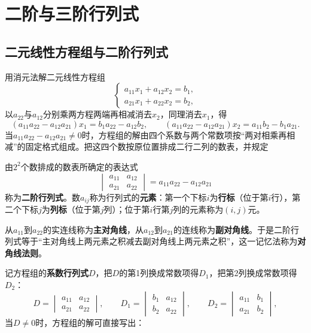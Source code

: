 \section{二阶与三阶行列式}

\subsection{二元线性方程组与二阶行列式}

用消元法解二元线性方程组
\[
\begin{cases}
a_{11}x_1+a_{12}x_2=b_1,\\
a_{21}x_1+a_{22}x_2=b_2,
\end{cases}
\]
以$a_{22}$与$a_{12}$分别乘两方程两端再相减消去$x_2$，同理消去$x_1$，得
\[
(a_{11}a_{22}-a_{12}a_{21})x_1=b_1a_{22}-a_{12}b_2,\qquad
(a_{11}a_{22}-a_{12}a_{21})x_2=a_{11}b_2-b_1a_{21}.
\]
当$a_{11}a_{22}-a_{12}a_{21}\neq 0$时，方程组的解由四个系数与两个常数项按“两对相乘再相减”的固定格式组成。把这四个数按原位置排成二行二列的数表，并规定

\begin{definition}
由$2^2$个数排成的数表所确定的表达式
\[
\begin{vmatrix}
a_{11} & a_{12}\\
a_{21} & a_{22}
\end{vmatrix}
=a_{11}a_{22}-a_{12}a_{21}
\]
称为\textbf{二阶行列式}。数$a_{ij}$称为行列式的\textbf{元素}：第一个下标$i$为\textbf{行标}（位于第$i$行），第二个下标$j$为\textbf{列标}（位于第$j$列）；位于第$i$行第$j$列的元素称为$(i,j)$元。
\end{definition}

从$a_{11}$到$a_{22}$的实连线称为\textbf{主对角线}，从$a_{12}$到$a_{21}$的连线称为\textbf{副对角线}。于是二阶行列式等于“主对角线上两元素之积减去副对角线上两元素之积”，这一记忆法称为\textbf{对角线法则}。

记方程组的\textbf{系数行列式}$D$，把$D$的第1列换成常数项得$D_1$，把第2列换成常数项得$D_2$：
\[
D=\begin{vmatrix}a_{11}&a_{12}\\a_{21}&a_{22}\end{vmatrix},\qquad
D_1=\begin{vmatrix}b_1&a_{12}\\b_2&a_{22}\end{vmatrix},\qquad
D_2=\begin{vmatrix}a_{11}&b_1\\a_{21}&b_2\end{vmatrix},
\]
当$D\neq0$时，方程组的解可直接写出：

